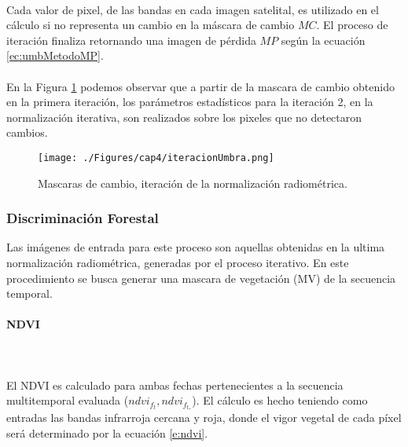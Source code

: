 \\  Cada valor de pixel, de las bandas en cada imagen satelital, es utilizado en el c\'alculo si no representa un cambio en la m\'ascara de cambio $ MC $. El proceso de iteraci\'on finaliza retornando una imagen de p\'erdida $ MP $ seg\'un la ecuaci\'on \ref{ec:umbMetodoMP}.\\~\\
En la Figura \ref{fig:iteracionRadiometrica} podemos observar que a partir de la mascara de cambio obtenido en la primera iteraci\'on, los par\'ametros estad\'isticos para la iteraci\'on 2, en la normalizaci\'on iterativa, son realizados sobre los pixeles que no detectaron cambios. 
\begin{figure}[H]
	\centering
	\texttt{[image: ./Figures/cap4/iteracionUmbra.png]}
	\caption{Mascaras de cambio, iteraci\'on de la normalizaci\'on radiom\'etrica.}
	\label{fig:iteracionRadiometrica}
\end{figure}


\subsubsection{Discriminaci\'on Forestal}\label{sec:discrForestalMet}
Las im\'agenes de entrada para este proceso son aquellas obtenidas en la ultima normalizaci\'on radiom\'etrica, generadas por el proceso iterativo. En este procedimiento se busca generar una mascara de vegetaci\'on (MV) de la secuencia temporal.
\paragraph{NDVI}\mbox{}\\\mbox{}\\
El NDVI es calculado para ambas fechas pertenecientes a la secuencia multitemporal evaluada ($ndvi_{f_{t}},ndvi_{f_{t_{*}}}  $). El c\'alculo es hecho teniendo como entradas las bandas infrarroja cercana y roja, donde el vigor vegetal de cada p\'ixel ser\'a determinado por la ecuaci\'on \ref{e:ndvi}. 
